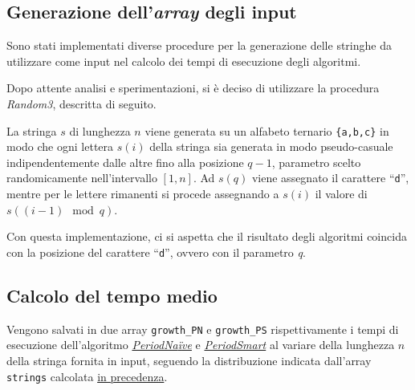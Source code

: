 \documentclass[11pt,a4paper,italian]{article}
\begin{document}
\begin{center}
\end{center}

\subsection{Generazione dell'\textit{array} degli input}
Sono stati implementati diverse procedure per la generazione delle stringhe da utilizzare come input nel calcolo dei tempi di esecuzione degli algoritmi.

Dopo attente analisi e sperimentazioni, si è deciso di utilizzare la procedura \textit{Random3}, descritta di seguito.

La stringa $s$ di lunghezza $n$ viene generata su un alfabeto ternario \texttt{\{a,b,c\}} in modo che ogni lettera $s(i)$ della stringa sia generata in modo pseudo-casuale indipendentemente dalle altre fino alla posizione $q-1$, parametro scelto randomicamente nell'intervallo $[1,n]$. Ad $s(q)$ viene assegnato il carattere ``\texttt{d}'', mentre per le lettere rimanenti si procede assegnando a $s(i)$ il valore di $s( (i-1) \mod q )$.

Con questa implementazione, ci si aspetta che il risultato degli algoritmi coincida con la posizione del carattere ``\texttt{d}'', ovvero con il parametro \textit{q}.

\subsection{Calcolo del tempo medio}
Vengono salvati in due array \texttt{growth\_PN} e \texttt{growth\_PS} rispettivamente i tempi di esecuzione dell'algoritmo \hyperlink{section.2}{\textit{PeriodNa{\"i}ve}} e \hyperlink{section.3}{\textit{PeriodSmart}} al variare della lunghezza $n$ della stringa fornita in input, seguendo la distribuzione indicata dall'array \texttt{strings} calcolata \hyperlink{subsection.4.3}{in precedenza}.

\end{document}
